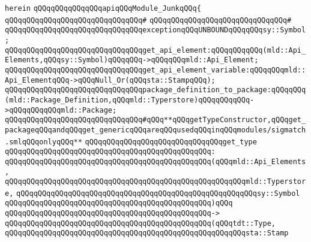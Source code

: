 \verb|herein|\newline
\newline
\verb|qQQqqQQqqQQqqQQqapiqQQqModule_JunkqQQq{|\newline
\verb|qQQqqQQqqQQqqQQqqQQqqQQqqQQqqQQq#|\newline
\verb|qQQqqQQqqQQqqQQqqQQqqQQqqQQqqQQq#|\newline
\newline
\verb|qQQqqQQqqQQqqQQqqQQqqQQqqQQqqQQqexceptionqQQqUNBOUNDqQQqqQQqsy::Symbol;|\newline
\newline
\verb|qQQqqQQqqQQqqQQqqQQqqQQqqQQqqQQqget_api_element:qQQqqQQqqQQq(mld::Api_Elements,qQQqsy::Symbol)qQQqqQQq->qQQqqQQqmld::Api_Element;|\newline
\newline
\verb|qQQqqQQqqQQqqQQqqQQqqQQqqQQqqQQqget_api_element_variable:qQQqqQQqmld::Api_ElementqQQq->qQQqNull_Or(qQQqsta::StampqQQq);|\newline
\newline
\verb|qQQqqQQqqQQqqQQqqQQqqQQqqQQqqQQqpackage_definition_to_package:qQQqqQQq(mld::Package_Definition,qQQqmld::Typerstore)qQQqqQQqqQQq->qQQqqQQqqQQqmld::Package;|\newline
\newline
\verb|qQQqqQQqqQQqqQQqqQQqqQQqqQQqqQQq#qQQq**qQQqgetTypeConstructor,qQQqget_packageqQQqandqQQqget_genericqQQqareqQQqusedqQQqinqQQqmodules/sigmatch.smlqQQqonlyqQQq**|\newline
\newline
\verb|qQQqqQQqqQQqqQQqqQQqqQQqqQQqqQQqget_type|\newline
\verb|qQQqqQQqqQQqqQQqqQQqqQQqqQQqqQQqqQQqqQQqqQQqqQQq:|\newline
\verb|qQQqqQQqqQQqqQQqqQQqqQQqqQQqqQQqqQQqqQQqqQQqqQQq(qQQqmld::Api_Elements,|\newline
\verb|qQQqqQQqqQQqqQQqqQQqqQQqqQQqqQQqqQQqqQQqqQQqqQQqqQQqqQQqmld::Typerstore,|\newline
\verb|qQQqqQQqqQQqqQQqqQQqqQQqqQQqqQQqqQQqqQQqqQQqqQQqqQQqqQQqsy::Symbol|\newline
\verb|qQQqqQQqqQQqqQQqqQQqqQQqqQQqqQQqqQQqqQQqqQQqqQQq)qQQq|\newline
\verb|qQQqqQQqqQQqqQQqqQQqqQQqqQQqqQQqqQQqqQQqqQQqqQQq->|\newline
\verb|qQQqqQQqqQQqqQQqqQQqqQQqqQQqqQQqqQQqqQQqqQQqqQQq(qQQqtdt::Type,|\newline
\verb|qQQqqQQqqQQqqQQqqQQqqQQqqQQqqQQqqQQqqQQqqQQqqQQqqQQqqQQqsta::Stamp|\newline
